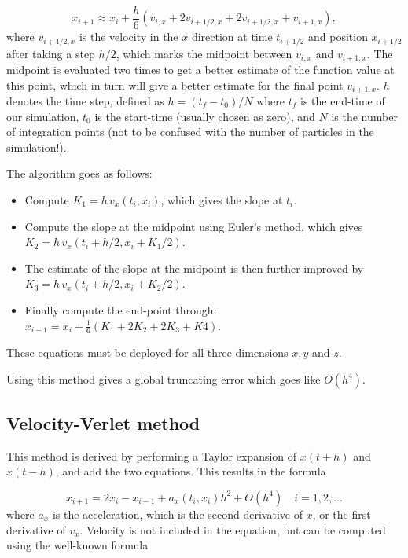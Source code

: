 \documentclass{article}
\begin{document}
\begin{multicols}{2}
\begin{equation}
	x_{i+1} \approx x_i + \frac{h}{6} (v_{i,x} + 2 v_{i + 1/2,x} + 2 v_{i + 1/2,x} + v_{i+1,x}),
\end{equation}
where $v_{i + 1/2,x} $ is the velocity in the $x$ direction at time $t_{i + 1/2}$ and position $x_{i + 1/2}$ after taking a step $h/2$, which marks the midpoint between $v_{i,x}$ and $v_{i+1,x}$. The midpoint is evaluated two times to get a better estimate of the function value at this point, which in turn will give a better estimate for the final point $v_{i+1,x}$. $h$ denotes the time step, defined as $h = (t_f - t_0)/N$ where $t_f$ is the end-time of our simulation, $t_0$ is the start-time (usually chosen as zero), and $N$ is the number of integration points (not to be confused with the number of particles in the simulation!).

The algorithm goes as follows:

\begin{itemize}
	\item Compute $K_1 = h \, v_x(t_i,x_i)$, which gives the slope at $t_i$.
	\item Compute the slope at the midpoint using Euler's method, which gives $K_2 = h \, v_x(t_i + h/2, x_i + K_1/2)$.
	\item The estimate of the slope at the midpoint is then further improved by $K_3 = h \, v_x(t_i + h/2, x_i + K_2/2)$.
	\item Finally compute the end-point through: \\ $x_{i+1} = x_i + \frac{1}{6}(K_1 + 2K_2 + 2K_3 + K4)$.
\end{itemize}
These equations must be deployed for all three dimensions $x,y$ and $z$.

Using this method gives a global truncating error which goes like $O(h^4)$. 




\subsection{Velocity-Verlet method}\label{sec:VV}
This method is derived by performing a Taylor expansion of $x(t+h)$ and $x(t-h)$, and add the two equations. This results in the formula

\begin{equation}\label{eq:verlet}
	x_{i+1} = 2x_i - x_{i-1} + a_x(t_i,x_i)h^2 + O(h^4) \quad i = 1, 2, \dots
\end{equation}
where $a_x$ is the acceleration, which is the second derivative of $x$, or the first derivative of $v_x$. Velocity is not included in the equation, but can be computed using the well-known formula


\end{multicols}
\end{document}
